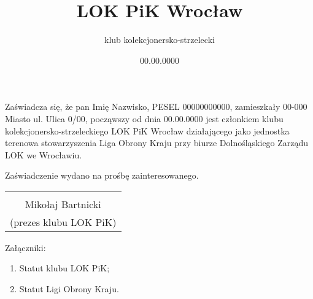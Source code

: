 \documentclass[a4paper,12pt]{article}
\title{LOK PiK Wrocław}
\author{klub kolekcjonersko-strzelecki}
\date{00.00.0000}
\begin{document}
\maketitle
\thispagestyle{empty} %
Zaświadcza się, że pan Imię Nazwisko, PESEL 00000000000, zamieszkały 00-000 Miasto ul. Ulica 0/00, począwszy od dnia 00.00.0000 jest członkiem klubu kolekcjonersko-strzeleckiego LOK PiK Wrocław działającego jako jednostka terenowa stowarzyszenia Liga Obrony Kraju przy biurze Dolnośląskiego Zarządu LOK we Wrocławiu.

Zaświadczenie wydano na prośbę zainteresowanego.
\vspace{4em}
\begin{flushright}
    \begin{tabular}{ c }
        \dotfill\\
        Mikołaj Bartnicki\\
        (prezes klubu LOK PiK)
    \end{tabular}
\end{flushright}
Załączniki:
\begin{enumerate}
    \item Statut klubu LOK PiK;
    \item Statut Ligi Obrony Kraju.
\end{enumerate}
\end{document}
